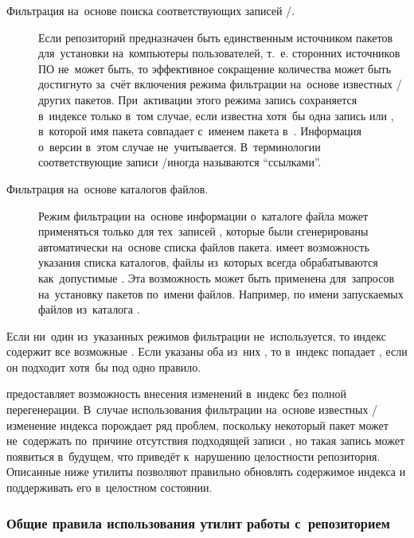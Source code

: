 \begin{description}

\item[Фильтрация на~основе поиска соответствующих записей \requires/\conflicts.]
Если репозиторий предназначен быть единственным источником пакетов для~установки на~компьютеры пользователей, 
т.~е. сторонних источников ПО не~может быть, 
то эффективное сокращение количества \provides может быть достигнуто за~счёт включения режима фильтрации на~основе известных \requires/\conflicts других пакетов.
При~активации этого режима запись \provides сохраняется в~индексе только в~том случае, если известна хотя~бы одна запись \requires или \conflicts,
в~которой имя пакета совпадает с~именем пакета в~\provides. 
Информация о~версии в~этом случае не~учитывается.
В~терминологии \ds соответствующие записи \requires/\conflicts иногда называются ``ссылками''.

\item[Фильтрация на~основе каталогов файлов.]
Режим фильтрации \provides на~основе информации о~каталоге файла может применяться только для тех~записей \provides,
которые были сгенерированы автоматически на~основе списка файлов пакета.
\ds имеет возможность указания списка  каталогов, файлы из~которых всегда обрабатываются как~допустимые \provides.
Эта возможность может быть применена для~запросов на~установку пакетов по~имени файлов.
Например, по имени запускаемых файлов из~каталога .

\end{description}

Если ни~один из~указанных режимов фильтрации \provides не~используется, то индекс содержит все возможные \provides.
Если указаны оба из~них , то в~индекс попадает \provides, если он подходит хотя~бы под одно правило.

\ds предоставляет возможность внесения изменений в~индекс без полной перегенерации.
В~случае использования фильтрации \provides на~основе известных \requires/\conflicts изменение индекса порождает ряд проблем,
поскольку некоторый пакет может не~содержать \provides по~причине отсутствия подходящей записи \requires, но такая запись может появиться в~будущем,
что приведёт к~нарушению целостности репозитория.
Описанные ниже утилиты позволяют правильно обновлять содержимое индекса и поддерживать его в~целостном состоянии.

\subsubsection{Общие правила использования утилит работы с~репозиторием}


